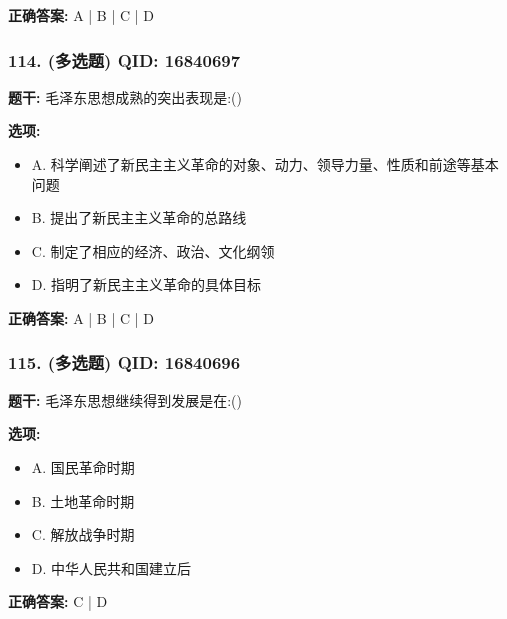 \documentclass[12pt,UTF8]{ctexart}
\begin{document}
\textbf{正确答案:}
A | B | C | D

\vspace{0.3em}\hrulefill\vspace{0.7em}

\subsubsection*{114. (多选题) \small QID: 16840697}

\textbf{题干:}
毛泽东思想成熟的突出表现是:()

\textbf{选项:}
\begin{itemize}[leftmargin=*]

  \item A. 科学阐述了新民主主义革命的对象、动力、领导力量、性质和前途等基本问题

  \item B. 提出了新民主主义革命的总路线

  \item C. 制定了相应的经济、政治、文化纲领

  \item D. 指明了新民主主义革命的具体目标

\end{itemize}

\textbf{正确答案:}
A | B | C | D

\vspace{0.3em}\hrulefill\vspace{0.7em}

\subsubsection*{115. (多选题) \small QID: 16840696}

\textbf{题干:}
毛泽东思想继续得到发展是在:()

\textbf{选项:}
\begin{itemize}[leftmargin=*]

  \item A. 国民革命时期

  \item B. 土地革命时期

  \item C. 解放战争时期

  \item D. 中华人民共和国建立后

\end{itemize}

\textbf{正确答案:}
C | D
\end{document}
